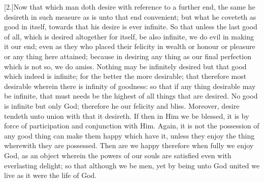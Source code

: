 [2.]Now that which man doth desire with reference to a further end, the same he desireth in such measure as is unto that end convenient; but what he coveteth as good in itself, towards that his desire is ever infinite. So that unless the last good of all, which is desired altogether for itself, be also infinite, we do evil in making it our end; even as they who placed their felicity in wealth or honour or pleasure or any thing here attained; because in desiring any thing as our final perfection which is not so, we do amiss. Nothing  may be infinitely desired but that good which indeed is infinite; for the better the more desirable; that therefore most desirable wherein there is infinity of goodness: so that if any thing desirable may be infinite, that must needs be the highest of all things that are desired. No good is infinite but only God; therefore he our felicity and bliss. Moreover, desire tendeth unto union with that it desireth. If then in Him we be blessed, it is by force of participation and conjunction with Him. Again, it is not the possession of any good thing can make them happy which have it, unless they enjoy the thing wherewith they are possessed. Then are we happy therefore when fully we enjoy God, as an object wherein the powers of our souls are satisfied even with everlasting delight; so that although we be men, yet by being unto God united we live as it were the life of God.

